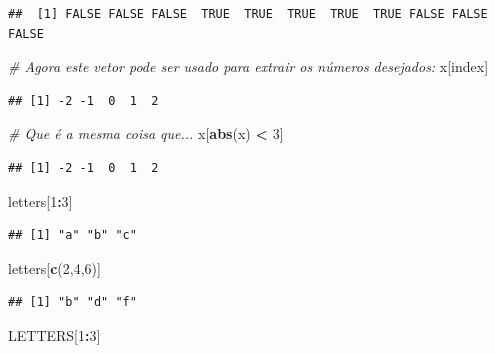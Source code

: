 \documentclass[
]{book}
\newenvironment{Shaded}{\begin{snugshade}}{\end{snugshade}}
\newcommand{\CommentTok}[1]{\textcolor[rgb]{0.56,0.35,0.01}{\textit{#1}}}
\newcommand{\DecValTok}[1]{\textcolor[rgb]{0.00,0.00,0.81}{#1}}
\newcommand{\FunctionTok}[1]{\textcolor[rgb]{0.13,0.29,0.53}{\textbf{#1}}}
\newcommand{\NormalTok}[1]{#1}
\newcommand{\SpecialCharTok}[1]{\textcolor[rgb]{0.81,0.36,0.00}{\textbf{#1}}}
\begin{document}
\begin{verbatim}
##  [1] FALSE FALSE FALSE  TRUE  TRUE  TRUE  TRUE  TRUE FALSE FALSE FALSE
\end{verbatim}

\begin{Shaded}
\begin{Highlighting}[]
\CommentTok{\# Agora este vetor pode ser usado para extrair os números desejados:}
\NormalTok{x[index]}
\end{Highlighting}
\end{Shaded}

\begin{verbatim}
## [1] -2 -1  0  1  2
\end{verbatim}

\begin{Shaded}
\begin{Highlighting}[]
\CommentTok{\# Que é a mesma coisa que...}
\NormalTok{x[}\FunctionTok{abs}\NormalTok{(x) }\SpecialCharTok{\textless{}} \DecValTok{3}\NormalTok{]}
\end{Highlighting}
\end{Shaded}

\begin{verbatim}
## [1] -2 -1  0  1  2
\end{verbatim}

\begin{Shaded}
\begin{Highlighting}[]
\NormalTok{letters[}\DecValTok{1}\SpecialCharTok{:}\DecValTok{3}\NormalTok{]}
\end{Highlighting}
\end{Shaded}

\begin{verbatim}
## [1] "a" "b" "c"
\end{verbatim}

\begin{Shaded}
\begin{Highlighting}[]
\NormalTok{letters[}\FunctionTok{c}\NormalTok{(}\DecValTok{2}\NormalTok{,}\DecValTok{4}\NormalTok{,}\DecValTok{6}\NormalTok{)]}
\end{Highlighting}
\end{Shaded}

\begin{verbatim}
## [1] "b" "d" "f"
\end{verbatim}

\begin{Shaded}
\begin{Highlighting}[]
\NormalTok{LETTERS[}\DecValTok{1}\SpecialCharTok{:}\DecValTok{3}\NormalTok{]}
\end{Highlighting}
\end{Shaded}
\end{document}
